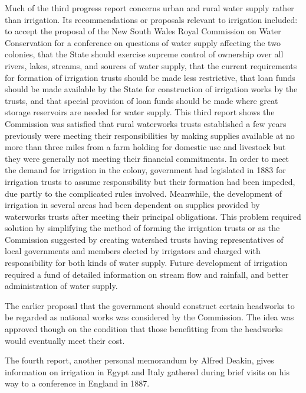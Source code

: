 Much of the third progress report concerns urban and rural water
supply rather than irrigation.  Its recommendations or proposals
relevant to irrigation included: to accept the proposal of the New
South Wales Royal Commission on Water Conservation  for a conference on questions of water supply affecting
the two colonies, that the State should exercise supreme control of
ownership over all rivers, lakes, streams, and sources of water
supply, that the current requirements for formation of irrigation
trusts should be made less restrictive, that loan funds should be made
available by the State for construction of irrigation works by the
trusts, and that special provision of loan funds should be made where
great storage reservoirs are needed for water supply.  This third
report shows the Commission was satisfied that rural waterworks trusts
 established a few years previously were
meeting their responsibilities by making supplies available at no more
than three miles from a farm holding for domestic use and livestock
but they were generally not meeting their financial commitments.  In
order to meet the demand for irrigation in the colony, government had
legislated in 1883 for irrigation trusts to assume responsibility but
their formation had been impeded, due partly to the complicated rules
involved.  Meanwhile, the development of irrigation in several areas
had been dependent on supplies provided by waterworks trusts after
meeting their principal obligations.  This problem required solution
by simplifying the method of forming the irrigation trusts
 or as the
Commission suggested by creating watershed trusts
 having
representatives of local governments and members elected by irrigators
and charged with responsibility for both kinds of water supply.
Future development of irrigation required a fund of detailed
information on stream flow and rainfall, and better administration of
water supply.

The earlier proposal that the government should construct certain
headworks to be regarded as national works was considered by the
Commission.  The idea was approved though on the condition that those
benefitting from the headworks would eventually meet their cost.

The fourth report, another personal memorandum by Alfred Deakin,
 gives
information on irrigation in Egypt  and Italy
 gathered
during brief visits on his way to a conference in England in
1887.

